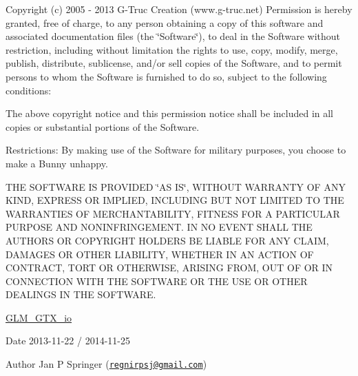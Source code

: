 Copyright (c) 2005 -\/ 2013 G-\/\+Truc Creation (www.\+g-\/truc.\+net) Permission is hereby granted, free of charge, to any person obtaining a copy of this software and associated documentation files (the \char`\"{}\+Software\char`\"{}), to deal in the Software without restriction, including without limitation the rights to use, copy, modify, merge, publish, distribute, sublicense, and/or sell copies of the Software, and to permit persons to whom the Software is furnished to do so, subject to the following conditions\+:

The above copyright notice and this permission notice shall be included in all copies or substantial portions of the Software.

Restrictions\+: By making use of the Software for military purposes, you choose to make a Bunny unhappy.

T\+H\+E S\+O\+F\+T\+W\+A\+R\+E I\+S P\+R\+O\+V\+I\+D\+E\+D \char`\"{}\+A\+S I\+S\char`\"{}, W\+I\+T\+H\+O\+U\+T W\+A\+R\+R\+A\+N\+T\+Y O\+F A\+N\+Y K\+I\+N\+D, E\+X\+P\+R\+E\+S\+S O\+R I\+M\+P\+L\+I\+E\+D, I\+N\+C\+L\+U\+D\+I\+N\+G B\+U\+T N\+O\+T L\+I\+M\+I\+T\+E\+D T\+O T\+H\+E W\+A\+R\+R\+A\+N\+T\+I\+E\+S O\+F M\+E\+R\+C\+H\+A\+N\+T\+A\+B\+I\+L\+I\+T\+Y, F\+I\+T\+N\+E\+S\+S F\+O\+R A P\+A\+R\+T\+I\+C\+U\+L\+A\+R P\+U\+R\+P\+O\+S\+E A\+N\+D N\+O\+N\+I\+N\+F\+R\+I\+N\+G\+E\+M\+E\+N\+T. I\+N N\+O E\+V\+E\+N\+T S\+H\+A\+L\+L T\+H\+E A\+U\+T\+H\+O\+R\+S O\+R C\+O\+P\+Y\+R\+I\+G\+H\+T H\+O\+L\+D\+E\+R\+S B\+E L\+I\+A\+B\+L\+E F\+O\+R A\+N\+Y C\+L\+A\+I\+M, D\+A\+M\+A\+G\+E\+S O\+R O\+T\+H\+E\+R L\+I\+A\+B\+I\+L\+I\+T\+Y, W\+H\+E\+T\+H\+E\+R I\+N A\+N A\+C\+T\+I\+O\+N O\+F C\+O\+N\+T\+R\+A\+C\+T, T\+O\+R\+T O\+R O\+T\+H\+E\+R\+W\+I\+S\+E, A\+R\+I\+S\+I\+N\+G F\+R\+O\+M, O\+U\+T O\+F O\+R I\+N C\+O\+N\+N\+E\+C\+T\+I\+O\+N W\+I\+T\+H T\+H\+E S\+O\+F\+T\+W\+A\+R\+E O\+R T\+H\+E U\+S\+E O\+R O\+T\+H\+E\+R D\+E\+A\+L\+I\+N\+G\+S I\+N T\+H\+E S\+O\+F\+T\+W\+A\+R\+E.

\hyperlink{group__gtx__io}{G\+L\+M\+\_\+\+G\+T\+X\+\_\+io}

\begin{DoxyDate}{Date}
2013-\/11-\/22 / 2014-\/11-\/25 
\end{DoxyDate}
\begin{DoxyAuthor}{Author}
Jan P Springer (\href{mailto:regnirpsj@gmail.com}{\tt regnirpsj@gmail.\+com}) 
\end{DoxyAuthor}
